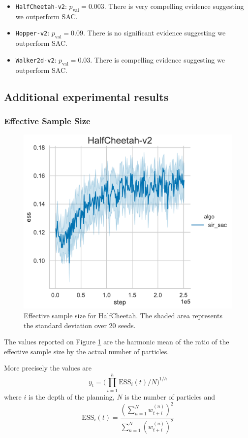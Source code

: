\begin{itemize}
    \item \texttt{HalfCheetah-v2}: $p_{\text{val}} = 0.003$. There is very compelling evidence suggesting we outperform SAC.
    \item \texttt{Hopper-v2}: $p_{\text{val}} = 0.09$. There is no significant evidence suggesting we outperform SAC.
    \item \texttt{Walker2d-v2}: $p_{\text{val}} = 0.03 $. There is compelling evidence suggesting we outperform SAC.
\end{itemize}

\subsection{Additional experimental results}
\label{app:add_results}
\subsubsection{Effective Sample Size}
\label{app:ess}

\begin{figure}[!h]
\centering
\includegraphics[width=0.5\linewidth]{articles/smcp/figures/HalfCheetah-v2_ess1543280008.pdf}
\caption{Effective sample size for HalfCheetah. The shaded area represents the standard deviation over 20 seeds.}
\label{fig:ess}
\end{figure}


The values reported on Figure \ref{fig:ess} are the harmonic mean of the ratio of the effective sample size by the actual number of particles.

More precisely the values are
$$y_t =  \big(\prod_{i=1}^{h} \text{ESS}_i(t) / N \big)^{1/h}$$
where $i$ is the depth of the planning, $N$ is the number of particles and 
$$\text{ESS}_i(t) = \frac{(\sum_{n=1}^N w_{t+i}^{(n)})^2}{\sum_{n=1}^N (w_{t+i}^{(n)})^2}$$ 

